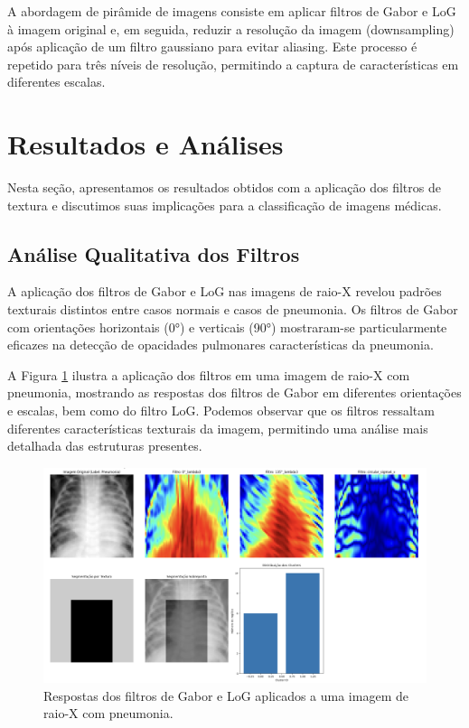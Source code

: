 \documentclass[sigconf,nonacm]{acmart}
\begin{document}
A abordagem de pirâmide de imagens consiste em aplicar filtros de Gabor e LoG à imagem original e, em seguida, reduzir a resolução da imagem (downsampling) após aplicação de um filtro gaussiano para evitar aliasing. Este processo é repetido para três níveis de resolução, permitindo a captura de características em diferentes escalas.

\section{Resultados e Análises}

Nesta seção, apresentamos os resultados obtidos com a aplicação dos filtros de textura e discutimos suas implicações para a classificação de imagens médicas.

\subsection{Análise Qualitativa dos Filtros}

A aplicação dos filtros de Gabor e LoG nas imagens de raio-X revelou padrões texturais distintos entre casos normais e casos de pneumonia. Os filtros de Gabor com orientações horizontais (0°) e verticais (90°) mostraram-se particularmente eficazes na detecção de opacidades pulmonares características da pneumonia.

A Figura \ref{fig:filtros_pneumonia} ilustra a aplicação dos filtros em uma imagem de raio-X com pneumonia, mostrando as respostas dos filtros de Gabor em diferentes orientações e escalas, bem como do filtro LoG. Podemos observar que os filtros ressaltam diferentes características texturais da imagem, permitindo uma análise mais detalhada das estruturas presentes.
\begin{figure}[h]
  \centering
  \includegraphics[width=1\linewidth]{../images/filtros_pneumonia.png}
  \caption{Respostas dos filtros de Gabor e LoG aplicados a uma imagem de raio-X com pneumonia.}
  \label{fig:filtros_pneumonia}
\end{figure}
\end{document}
